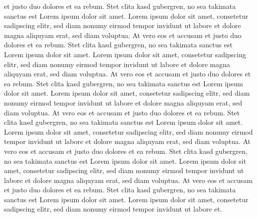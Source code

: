 \documentclass[12pt, a4paper, onecolumn]{article}
\let \footnote=\endnote %
\begin{document}
	et justo duo dolores et ea rebum. Stet clita kasd\footnote{Third} gubergren, no sea takimata sanctus est Lorem ipsum dolor sit amet. Lorem ipsum dolor sit amet, consetetur sadipscing elitr, sed diam nonumy eirmod tempor invidunt ut labore et dolore magna aliquyam erat, sed diam voluptua. At vero eos et accusam et justo duo dolores et ea rebum. Stet clita kasd gubergren, no sea takimata sanctus est Lorem ipsum dolor sit amet. Lorem ipsum dolor sit amet, consetetur sadipscing elitr, sed diam nonumy eirmod tempor invidunt ut labore et dolore magna aliquyam erat, sed diam voluptua. At vero eos et accusam et justo duo dolores et ea rebum. Stet clita kasd gubergren, no sea takimata sanctus est Lorem ipsum dolor sit amet. Lorem ipsum dolor sit amet, consetetur sadipscing elitr, sed diam nonumy eirmod tempor invidunt ut labore et dolore magna aliquyam erat, sed diam voluptua. At vero eos et accusam et justo duo dolores et ea rebum. Stet clita kasd gubergren, no sea\footnote{Fifth} takimata sanctus est Lorem ipsum dolor\footnote{Fourth} sit amet. Lorem ipsum dolor sit amet, consetetur sadipscing elitr, sed diam nonumy eirmod tempor invidunt ut labore et dolore magna aliquyam erat, sed diam voluptua. At vero eos et accusam et justo duo dolores et ea rebum. Stet clita kasd gubergren, no sea takimata sanctus est Lorem ipsum dolor sit amet. Lorem ipsum dolor sit amet, consetetur sadipscing elitr, sed diam nonumy eirmod tempor invidunt ut labore et dolore magna aliquyam erat, sed diam\footnote{Sixth} voluptua. At vero eos et accusam et justo duo dolores et ea rebum. Stet clita kasd gubergren, no sea takimata sanctus est Lorem ipsum dolor sit amet. Lorem ipsum dolor sit amet, consetetur sadipscing elitr, sed diam nonumy eirmod tempor invidunt ut labore et.
	
	\theendnotes
	
\end{document}

